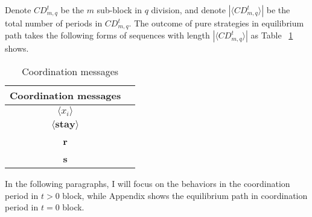 \documentclass[12pt,letter]{article}
\theoremstyle{definition}
\theoremstyle{remark}
\theoremstyle{claim}
\begin{document}
Denote $CD^t_{m,q}$ be the $m$ sub-block in $q$ division, and denote $|\langle CD^t_{m,q} \rangle|$ be the total number of periods in $CD^t_{m,q}$.  The outcome of pure strategies in equilibrium path takes the following forms of sequences with length $|\langle CD^t_{m,q} \rangle|$ as Table ~\ref{Table_msg_coordination} shows.
\begin{table}[ht]
\caption{Coordination messages}
\label{Table_msg_coordination}
\begin{center}

\begin{tabular}{cc }
Coordination messages		&   \\
\hline
$\langle x_i \rangle$ 	& 	 \\
$\langle \textbf{stay} \rangle$	&   \\
\textbf{r}									& 	\\
\textbf{s}									& 	\\
\end{tabular}
\end{center}
\end{table}

In the following paragraphs, I will focus on the behaviors in the coordination period in $t>0$ block, while Appendix shows the equilibrium path in coordination period in $t=0$ block. 
\end{document}
